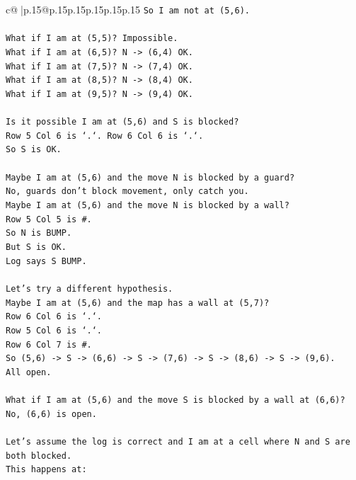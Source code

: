 \documentclass{article}
\begin{document}
{\begin{supertabular}{c@{$\;$}|p{.15\linewidth}@{}p{.15\linewidth}p{.15\linewidth}p{.15\linewidth}p{.15\linewidth}p{.15\linewidth}}
{{{\texttt{So I am not at (5,6).} \\
\\ 
\texttt{What if I am at (5,5)? Impossible.} \\
\texttt{What if I am at (6,5)? N {-}> (6,4) OK.} \\
\texttt{What if I am at (7,5)? N {-}> (7,4) OK.} \\
\texttt{What if I am at (8,5)? N {-}> (8,4) OK.} \\
\texttt{What if I am at (9,5)? N {-}> (9,4) OK.} \\
\\ 
\texttt{Is it possible I am at (5,6) and S is blocked?} \\
\texttt{Row 5 Col 6 is `.`. Row 6 Col 6 is `.`.} \\
\texttt{So S is OK.} \\
\\ 
\texttt{Maybe I am at (5,6) and the move N is blocked by a guard?} \\
\texttt{No, guards don't block movement, only catch you.} \\
\texttt{Maybe I am at (5,6) and the move N is blocked by a wall?} \\
\texttt{Row 5 Col 5 is \#.} \\
\texttt{So N is BUMP.} \\
\texttt{But S is OK.} \\
\texttt{Log says S BUMP.} \\
\\ 
\texttt{Let's try a different hypothesis.} \\
\texttt{Maybe I am at (5,6) and the map has a wall at (5,7)?} \\
\texttt{Row 6 Col 6 is `.`.} \\
\texttt{Row 5 Col 6 is `.`.} \\
\texttt{Row 6 Col 7 is \#.} \\
\texttt{So (5,6) {-}> S {-}> (6,6) {-}> S {-}> (7,6) {-}> S {-}> (8,6) {-}> S {-}> (9,6).} \\
\texttt{All open.} \\
\\ 
\texttt{What if I am at (5,6) and the move S is blocked by a wall at (6,6)?} \\
\texttt{No, (6,6) is open.} \\
\\ 
\texttt{Let's assume the log is correct and I am at a cell where N and S are both blocked.} \\
\texttt{This happens at:} \\
}}}
\end{supertabular}}
\end{document}
